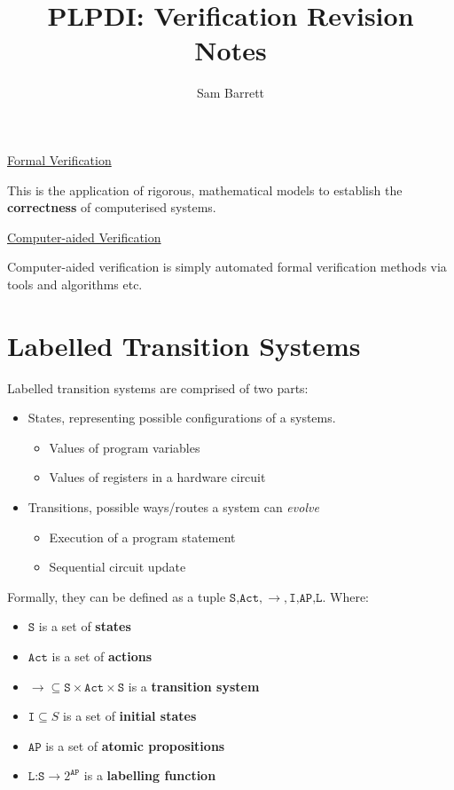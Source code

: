 \documentclass{article}
\title{PLPDI: Verification Revision Notes}
\author{Sam Barrett}
\begin{document}
\maketitle

\underline{Formal Verification}

This is the application of rigorous, mathematical models to establish the \textbf{correctness} of computerised systems.

\underline{Computer-aided Verification}

Computer-aided verification is simply automated formal verification methods via tools and algorithms etc.

\section{Labelled Transition Systems}

Labelled transition systems are comprised of two parts:

\begin{itemize}
  \item States, representing possible configurations of a systems.
        \begin{itemize}
          \item Values of program variables
          \item Values of registers in a hardware circuit
        \end{itemize}
  \item Transitions, possible ways/routes a system can \textit{evolve}
        \begin{itemize}
          \item Execution of a program statement
          \item Sequential circuit update
        \end{itemize}
\end{itemize}

Formally, they can be defined as a tuple $\texttt{S,Act},\rightarrow , \texttt{I,AP,L} $.
Where:
\begin{itemize}
  \item $\texttt{S} $ is a set of \textbf{states}
  \item $\texttt{Act}$ is a set of \textbf{actions}
  \item $\rightarrow \subseteq \texttt{S}\times \texttt{Act} \times \texttt{S} $ is a \textbf{transition system}
  \item $\texttt{I} \subseteq S$ is a set of \textbf{initial states}
  \item $\texttt{AP} $ is a set of \textbf{atomic propositions}
  \item $\texttt{L:S} \rightarrow 2^{\texttt{AP} } $ is a \textbf{labelling function}
\end{itemize}
\end{document}
